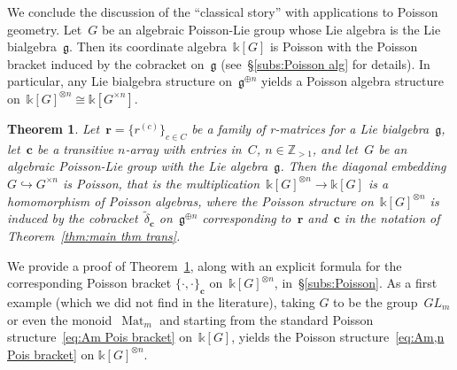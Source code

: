 \documentclass[12pt, reqno]{amsart}
\newtheorem{theorem}{Theorem}[section]
\theoremstyle{definition}
\numberwithin{equation}{section}
\newcommand{\tensor}{\otimes}
\newcommand{\kk}{\mathbb{k}}\newcommand{\lie}[1]{{\mathfrak{#1}}}
\newcommand{\ZZ}{{\mathbb Z}}
\DeclareMathOperator{\Mat}{Mat}
\begin{document}
We conclude the discussion of the ``classical story'' with applications to Poisson geometry. Let~$G$
be an algebraic Poisson-Lie group whose Lie algebra is 
the Lie bialgebra~$\lie g$. Then its coordinate algebra~$\kk[G]$ is Poisson
with the Poisson bracket induced by
the cobracket on~$\lie g$ (see~\S\ref{subs:Poisson alg} for details). In particular, any Lie bialgebra structure on~$\lie g^{\oplus n}$ yields a Poisson algebra structure on~$\kk[G]^{\tensor n}\cong \kk[G^{\times n}]$.
\begin{theorem}\label{thm:Poisson mult}
Let~$\mathbf r=\{r^{(c)}\}_{c\in C}$ be 
a family of r-matrices for a Lie bialgebra~$\lie g$, let~$\mathbf c$ be a transitive $n$-array with entries in~$C$, $n\in\ZZ_{>1}$, and let~$G$ be an algebraic Poisson-Lie group with the Lie algebra~$\lie g$. Then
the diagonal embedding $G\hookrightarrow G^{\times n}$ is Poisson, that is the multiplication~$\kk[G]^{\tensor n}\to\kk[G]$ 
is a homomorphism of Poisson algebras, where 
the Poisson structure on~$\kk[G]^{\tensor n}$ is induced by the cobracket~$\tilde\delta_{\mathbf c}$ on~$\lie g^{\oplus n}$ corresponding to~$\mathbf r$ and~$\mathbf c$ in the notation of Theorem~\ref{thm:main thm trans}.
\end{theorem}
We provide a proof of Theorem~\ref{thm:Poisson mult},
along with an explicit formula for the corresponding Poisson bracket
$\{\cdot,\cdot\}_{\mathbf c}$ on~$\kk[G]^{\tensor n}$,
in~\S\ref{subs:Poisson}.
As a first example (which we did not find in the literature), taking $G$ to be the group~$GL_m$ or even the monoid~$\Mat_m$ and starting from the standard Poisson structure~\eqref{eq:Am Pois bracket} on~$\kk[G]$, yields the Poisson structure~\eqref{eq:Am,n Pois bracket} on
$\kk[G]^{\tensor n}$.
\end{document}

